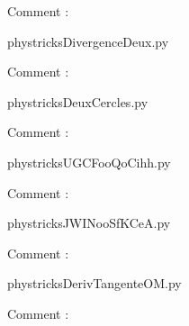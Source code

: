     Comment : 

    \clearpage
    


    \newcommand{\CaptionFigDivergenceDeux}{<+Type your caption here+>}
    \begin{center}
        
    \end{center}
    phystricksDivergenceDeux.py

    Comment : 

    \clearpage
    


    \newcommand{\CaptionFigDeuxCercles}{<+Type your caption here+>}
    \begin{center}
        
    \end{center}
    phystricksDeuxCercles.py

    Comment : 

    \clearpage
    


    \newcommand{\CaptionFigUGCFooQoCihh}{<+Type your caption here+>}
    \begin{center}
        
    \end{center}
    phystricksUGCFooQoCihh.py

    Comment : 

    \clearpage
    


    \newcommand{\CaptionFigJWINooSfKCeA}{<+Type your caption here+>}
    \begin{center}
        
    \end{center}
    phystricksJWINooSfKCeA.py

    Comment : 

    \clearpage
    


    \newcommand{\CaptionFigDerivTangenteOM}{<+Type your caption here+>}
    \begin{center}
        
    \end{center}
    phystricksDerivTangenteOM.py

    Comment : 

    \clearpage
    

